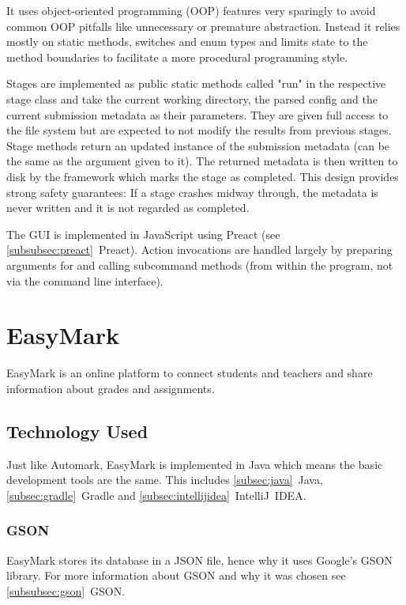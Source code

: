 \documentclass[12pt,a4paper,oneside]{report}
\begin{document}
	It uses object-oriented programming (OOP) features very sparingly to avoid common OOP pitfalls like unnecessary or premature abstraction. Instead it relies mostly on static methods, switches and enum types and limits state to the method boundaries to facilitate a more procedural programming style.

	Stages are implemented as public static methods called "run" in the respective stage class and take the current working directory, the parsed config and the current submission metadata as their parameters. They are given full access to the file system but are expected to not modify the results from previous stages. Stage methods return an updated instance of the submission metadata (can be the same as the argument given to it). The returned metadata is then written to disk by the framework which marks the stage as completed. This design provides strong safety guarantees: If a stage crashes midway through, the metadata is never written and it is not regarded as completed.

	The GUI is implemented in JavaScript using Preact (see \ref{subsubsec:preact}~Preact). Action invocations are handled largely by preparing arguments for and calling subcommand methods (from within the program, not via the command line interface).

	\chapter{EasyMark}
	EasyMark is an online platform to connect students and teachers and share information about grades and assignments.

	\section{Technology Used}
	Just like Automark, EasyMark is implemented in Java which means the basic development tools are the same. This includes \ref{subsec:java}~Java, \ref{subsec:gradle}~Gradle and \ref{subsec:intellijidea}~IntelliJ~IDEA.

	\subsection{GSON}
	EasyMark stores its database in a JSON file, hence why it uses Google's GSON library. For more information about GSON and why it was chosen see \ref{subsubsec:gson}~GSON.
\end{document}
